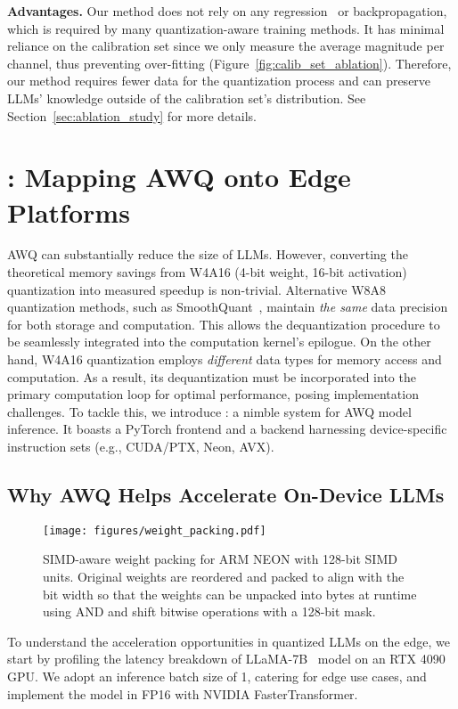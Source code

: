 \textbf{Advantages.} 
Our method does not rely on any regression~\cite{frantar2022gptq} or backpropagation, which is required by many quantization-aware training methods. It has minimal reliance on the calibration set since we only measure the average magnitude per channel, thus preventing over-fitting (Figure~\ref{fig:calib_set_ablation}). Therefore, our method requires fewer data for the quantization process and can preserve LLMs' knowledge outside of the calibration set's distribution. 
See Section~\ref{sec:ablation_study} for more details. %

\section{\system: Mapping AWQ onto Edge Platforms}

AWQ can substantially reduce the size of LLMs. However, converting the theoretical memory savings from W4A16 (4-bit weight, 16-bit activation) quantization into measured speedup is non-trivial. Alternative W8A8 quantization methods, such as SmoothQuant~\cite{xiao2022smoothquant}, maintain \textit{the same} data precision for both storage and computation. This allows the dequantization procedure to be seamlessly integrated into the computation kernel's epilogue. On the other hand, W4A16 quantization employs \textit{different} data types for memory access and computation. As a result, its dequantization must be incorporated into the primary computation loop for optimal performance, posing implementation challenges. To tackle this, we introduce \system: a nimble system for AWQ model inference. It boasts a PyTorch frontend and a backend harnessing device-specific instruction sets (e.g., CUDA/PTX, Neon, AVX).

\subsection{Why AWQ Helps Accelerate On-Device LLMs}

\begin{figure*}
    \centering
     \texttt{[image: figures/weight\_packing.pdf]}
    \caption{SIMD-aware weight packing for ARM NEON with 128-bit SIMD units. Original weights are reordered and packed to align with the bit width so that the weights can be unpacked into bytes at runtime using AND and shift bitwise operations with a 128-bit mask.} %
    \label{fig:weight_packing}
\end{figure*}

To understand the acceleration opportunities in quantized LLMs on the edge, we start by profiling the latency breakdown of LLaMA-7B~\cite{touvron2023llama} model on an RTX 4090 GPU. We adopt an inference batch size of 1, catering for edge use cases, and implement the model in FP16 with NVIDIA FasterTransformer. 

